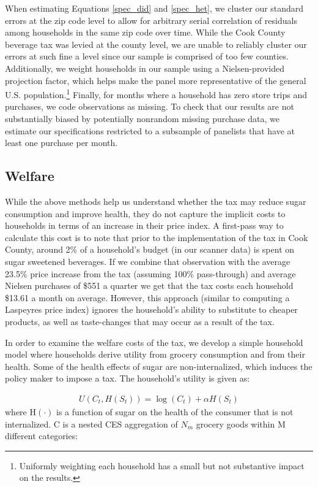 \documentclass[12pt]{article}
\begin{document}
When estimating Equations \ref{spec_did} and \ref{spec_het}, we cluster our standard errors at the zip code level to allow for arbitrary serial correlation of residuals among households in the same zip code over time. While the Cook County beverage tax was levied at the county level, we are unable to reliably cluster our errors at such fine a level since our sample is comprised of too few counties. Additionally, we weight households in our sample using a Nielsen-provided projection factor, which helps make the panel more representative of the general U.S. population.\footnote{Uniformly weighting each household has a small but not substantive impact on the results.} Finally, for months where a household has zero store trips and purchases, we code observations as missing. To check that our results are not substantially biased by potentially nonrandom missing purchase data, we estimate our specifications restricted to a subsample of panelists that have at least one purchase per month.

\subsection{Welfare}

While the above methods help us understand whether the tax may reduce sugar consumption and improve health, they do not capture the implicit costs to households in terms of an increase in their price index. A first-pass way to calculate this cost is to note that prior to the implementation of the tax in Cook County, around 2\% of a household's budget (in our scanner data) is spent on sugar sweetened beverages. If we combine that observation with the average 23.5\% price increase from the tax (assuming 100\% pass-through) and average Nielsen purchases of \$551 a quarter we get that the tax costs each household \$13.61 a month on average. However, this approach (similar to computing a Laspeyres price index) ignores the household's ability to substitute to cheaper products, as well as taste-changes that may occur as a result of the tax.

In order to examine the welfare costs of the tax, we develop a simple household model where households derive utility from grocery consumption and from their health. Some of the health effects of sugar are non-internalized, which induces the policy maker to impose a tax. The household's utility is given as:

\begin{align}
	U(C_t,H(S_t)) = \log(C_t) + \alpha H(S_t)
\end{align}
where H$(\cdot)$ is a function of sugar on the health of the consumer that is not internalized. C is a nested CES aggregation of $N_m$ grocery goods within M different categories:
\end{document}
